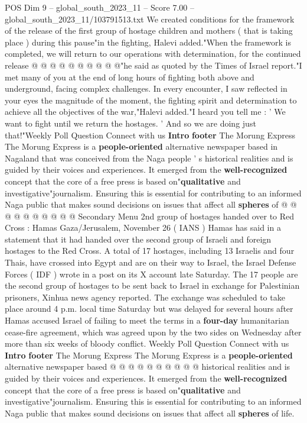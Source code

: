 \begin{textsample}{POS Dim 9 – global\_south\_2023\_11 – Score 7.00 – global\_south\_2023\_11/103791513.txt}
We created conditions for the framework of the release of the first group of hostage children and mothers ( that is taking place ) during this pause"in the fighting, Halevi added."When the framework is completed, we will return to our operations with determination, for the continued release @ @ @ @ @ @ @ @ @ @"he said as quoted by the Times of Israel report."I met many of you at the end of long hours of fighting both above and underground, facing complex challenges.
In every encounter, I saw reflected in your eyes the magnitude of the moment, the fighting spirit and determination to achieve all the objectives of the war,"Halevi added."I heard you tell me : ' We want to fight until we return the hostages. ' And so we are doing just that!"Weekly Poll Question Connect with us \textbf{Intro} \textbf{footer} The Morung Express The Morung Express is a \textbf{people-oriented} alternative newspaper based in Nagaland that was conceived from the Naga people ' s historical realities and is guided by their voices and experiences.
It emerged from the \textbf{well-recognized} concept that the core of a free press is based on"\textbf{qualitative} and investigative"journalism.
Ensuring this is essential for contributing to an informed Naga public that makes sound decisions on issues that affect all \textbf{spheres} of @ @ @ @ @ @ @ @ @ @ Secondary Menu 2nd group of hostages handed over to Red Cross : Hamas Gaza/Jerusalem, November 26 ( IANS ) Hamas has said in a statement that it had handed over the second group of Israeli and foreign hostages to the Red Cross.
A total of 17 hostages, including 13 Israelis and four Thais, have crossed into Egypt and are on their way to Israel, the Israel Defense Forces ( IDF ) wrote in a post on its X account late Saturday.
The 17 people are the second group of hostages to be sent back to Israel in exchange for Palestinian prisoners, Xinhua news agency reported.
The exchange was scheduled to take place around 4 p.m. local time Saturday but was delayed for several hours after Hamas accused Israel of failing to meet the terms in a \textbf{four-day} humanitarian cease-fire agreement, which was agreed upon by the two sides on Wednesday after more than six weeks of bloody conflict.
Weekly Poll Question Connect with us \textbf{Intro} \textbf{footer} The Morung Express The Morung Express is a \textbf{people-oriented} alternative newspaper based @ @ @ @ @ @ @ @ @ @ historical realities and is guided by their voices and experiences.
It emerged from the \textbf{well-recognized} concept that the core of a free press is based on"\textbf{qualitative} and investigative"journalism.
Ensuring this is essential for contributing to an informed Naga public that makes sound decisions on issues that affect all \textbf{spheres} of life.

\end{textsample}
